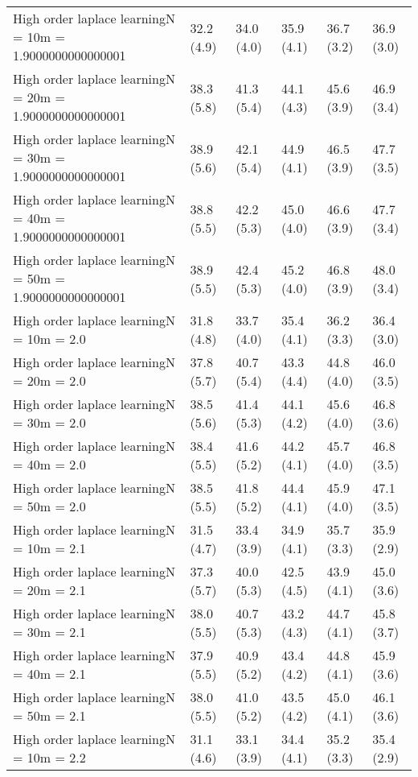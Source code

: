 \documentclass{article}
\begin{document}
\begin{table*}[t!]
\begin{center}
\begin{small}
\begin{sc}
\begin{tabular}{llllll}
High order laplace learningN = 10m = 1.9000000000000001&32.2 (4.9)      &34.0 (4.0)      &35.9 (4.1)      &36.7 (3.2)      &36.9 (3.0)      \\
High order laplace learningN = 20m = 1.9000000000000001&38.3 (5.8)      &41.3 (5.4)      &44.1 (4.3)      &45.6 (3.9)      &46.9 (3.4)      \\
High order laplace learningN = 30m = 1.9000000000000001&38.9 (5.6)      &42.1 (5.4)      &44.9 (4.1)      &46.5 (3.9)      &47.7 (3.5)      \\
High order laplace learningN = 40m = 1.9000000000000001&38.8 (5.5)      &42.2 (5.3)      &45.0 (4.0)      &46.6 (3.9)      &47.7 (3.4)      \\
High order laplace learningN = 50m = 1.9000000000000001&38.9 (5.5)      &42.4 (5.3)      &45.2 (4.0)      &46.8 (3.9)      &48.0 (3.4)      \\
High order laplace learningN = 10m = 2.0&31.8 (4.8)      &33.7 (4.0)      &35.4 (4.1)      &36.2 (3.3)      &36.4 (3.0)      \\
High order laplace learningN = 20m = 2.0&37.8 (5.7)      &40.7 (5.4)      &43.3 (4.4)      &44.8 (4.0)      &46.0 (3.5)      \\
High order laplace learningN = 30m = 2.0&38.5 (5.6)      &41.4 (5.3)      &44.1 (4.2)      &45.6 (4.0)      &46.8 (3.6)      \\
High order laplace learningN = 40m = 2.0&38.4 (5.5)      &41.6 (5.2)      &44.2 (4.1)      &45.7 (4.0)      &46.8 (3.5)      \\
High order laplace learningN = 50m = 2.0&38.5 (5.5)      &41.8 (5.2)      &44.4 (4.1)      &45.9 (4.0)      &47.1 (3.5)      \\
High order laplace learningN = 10m = 2.1&31.5 (4.7)      &33.4 (3.9)      &34.9 (4.1)      &35.7 (3.3)      &35.9 (2.9)      \\
High order laplace learningN = 20m = 2.1&37.3 (5.7)      &40.0 (5.3)      &42.5 (4.5)      &43.9 (4.1)      &45.0 (3.6)      \\
High order laplace learningN = 30m = 2.1&38.0 (5.5)      &40.7 (5.3)      &43.2 (4.3)      &44.7 (4.1)      &45.8 (3.7)      \\
High order laplace learningN = 40m = 2.1&37.9 (5.5)      &40.9 (5.2)      &43.4 (4.2)      &44.8 (4.1)      &45.9 (3.6)      \\
High order laplace learningN = 50m = 2.1&38.0 (5.5)      &41.0 (5.2)      &43.5 (4.2)      &45.0 (4.1)      &46.1 (3.6)      \\
High order laplace learningN = 10m = 2.2&31.1 (4.6)      &33.1 (3.9)      &34.4 (4.1)      &35.2 (3.3)      &35.4 (2.9)      \\

\end{tabular}
\end{sc}
\end{small}
\end{center}
\end{table*}
\end{document}
